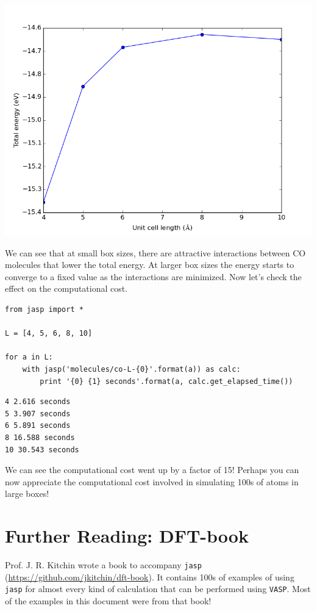 \documentclass[11pt]{article}
\begin{document}
\includegraphics[width=.9\linewidth]{./images/co-e-v.png}


We can see that at small box sizes, there are attractive interactions between CO molecules that lower the total energy. At larger box sizes the energy starts to converge to a fixed value as the interactions are minimized. Now let's check the effect on the computational cost.

\begin{verbatim}
from jasp import *

L = [4, 5, 6, 8, 10]

for a in L:
    with jasp('molecules/co-L-{0}'.format(a)) as calc:
        print '{0} {1} seconds'.format(a, calc.get_elapsed_time())
\end{verbatim}

\begin{verbatim}
4 2.616 seconds
5 3.907 seconds
6 5.891 seconds
8 16.588 seconds
10 30.543 seconds
\end{verbatim}

We can see the computational cost went up by a factor of 15! Perhaps you can now appreciate the computational cost involved in simulating 100s of atoms in large boxes!



\section{Further Reading: DFT-book}
\label{sec-8}

Prof. J. R. Kitchin wrote a book to accompany \texttt{jasp} (\url{https://github.com/jkitchin/dft-book}). It contains 100s of examples of using \texttt{jasp} for almost every kind of calculation that can be performed using \texttt{VASP}. Most of the examples in this document were from that book!
\end{document}
